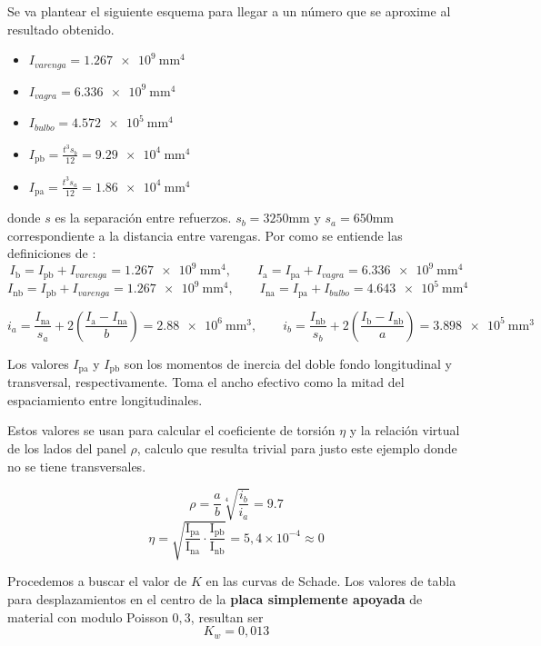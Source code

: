 \documentclass[onecolumn,10pt,titlepage]{article}
\begin{document}
Se va plantear el siguiente esquema para llegar a un número que se aproxime al resultado obtenido.
\begin{itemize}
	\item $I_{varenga}= \SI{1,267e9}{\milli \meter^4}$
	\item $I_{vagra}=\SI{6,336e9}{\milli \meter ^4}$
	\item $I_{bulbo}=\SI{4,572e5}{\milli \meter ^4}$
	\item $I_{\mathrm{pb}}= \frac{t^3 s_b}{12}=\SI{9,29e4}{\milli \meter^4} $
	\item $I_{\mathrm{pa}}= \frac{t^3 s_a}{12}=\SI{1,86e4}{\milli \meter^4} $
\end{itemize}
donde $s$ es la separación entre refuerzos. $s_b=3250\si{\milli \meter}$ y $s_a=650\si{\milli \meter}$ correspondiente a la distancia entre varengas. Por como se entiende las definiciones de \cite{dominguez1969calculo}:
\[
I_{\mathrm{b}}=I_{\mathrm{pb}}+I_{varenga}=\SI{1,267e9}{\milli \meter ^4}, \qquad I_{\mathrm{a}}=I_{\mathrm{pa}}+I_{vagra}=\SI{6,336e9}{\milli \meter ^4}
\]
\[
I_{\mathrm{nb}}=I_{\mathrm{pb}}+I_{varenga}=\SI{1,267e9}{\milli \meter ^4}, \qquad I_{\mathrm{na}}=I_{\mathrm{pa}}+I_{bulbo}=\SI{4,643e5}{\milli \meter ^4}
\]


\[
i_{a}=\frac{I_{\mathrm{n a}}}{s_{a}}+2\left(\frac{I_{\mathrm{a}}-I_{\mathrm{na}}}{b}\right)=\SI{2,88e6}{\milli \meter^3}, \qquad i_b = \frac{I_{\mathrm{n b}}}{s_{b}}+2\left(\frac{I_{\mathrm{b}}-I_{\mathrm{nb}}}{a}\right)=\SI{3,898e5}{\milli \meter^3}
\]

Los valores  $I_{\mathrm{pa}}$ y $I_{\mathrm{pb}}$ son los momentos de inercia del doble fondo longitudinal y transversal, respectivamente. Toma el ancho efectivo como la mitad del espaciamiento entre longitudinales.  

Estos valores se usan para calcular el coeficiente de torsión $\eta$ y la relación virtual de los lados del panel $\rho$, calculo que resulta trivial para justo este ejemplo donde no se tiene transversales.

\[
\rho=\frac{a}{b} \sqrt[4]{\frac{i_{b}}{i_{a}}}= 9.7
\]
\[
\eta=\sqrt{\frac{\mathrm{I}_{\mathrm{pa}}}{\mathrm{I}_{\mathrm{na}}} \cdot \frac{\mathrm{I}_{\mathrm{pb}}}{\mathrm{I}_{\mathrm{nb}}}} = 5,4\times 10^{-4} \approx 0
\]

Procedemos a buscar el valor de $K$ en las curvas de Schade. Los valores de tabla para desplazamientos en el centro de la \textbf{placa simplemente apoyada} de material con modulo Poisson $0,3$, resultan ser
\[
K_w=0,013  
\] 
\end{document}
